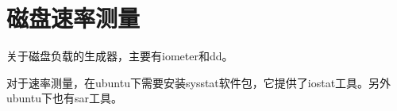 \section{磁盘速率测量}
关于磁盘负载的生成器，主要有iometer和dd。

对于速率测量，在ubuntu下需要安装sysstat软件包，它提供了iostat工具。另外ubuntu下也有sar工具。
